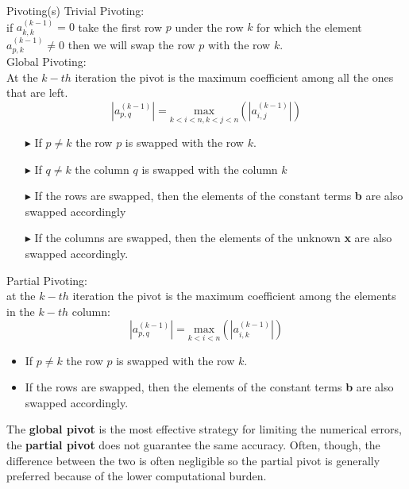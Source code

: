 \documentclass[xcolor={dvipsnames,rgb}, aspectratio=169]{beamer}
\begin{document}
\begin{frame}{Pivoting(s)}
   \vspace{-.5cm}
   \alert{Trivial Pivoting}:\\
   if $a_{k,k}^{(k-1)} = 0$ take the first row $p$ under the row $k$ for which the
   element $a_{p,k}^{(k-1)} \neq 0$ then we will swap the row $p$ with the row $k$.\\
   \alert{Global Pivoting}:\\
   At the $k-th$ iteration the pivot is the maximum coefficient among all the ones that
   are left.
   \begin{equation*}
      |a_{p,q}^{(k-1)}| = \underset{k<i<n,k<j<n}{\mathrm{max}}\left(|a_{i,j}^{(k-1)}|\right)
   \end{equation*}

   \footnotesize{
      \begin{itemize}
         \item[$\blacktriangleright$] If $p \neq k$ the row $p$ is swapped with the row
            $k$.
         \item[$\blacktriangleright$] If $q \neq k$ the column $q$ is swapped with the
            column $k$
         \item[$\blacktriangleright$] If the rows are swapped, then the elements of the
            constant terms \textbf{b} are also swapped accordingly
         \item[$\blacktriangleright$] If the columns are swapped, then the elements of
            the unknown \textbf{x} are also swapped accordingly.
      \end{itemize}
   }
\end{frame}

\begin{frame}{}
   \alert{Partial Pivoting}:\\
   at the $k-th$ iteration the pivot is the maximum coefficient among the elements in the
   $k-th$ column:
   \begin{equation*}
      |a_{p,q}^{(k-1)}| = \underset{k<i<n}{\mathrm{max}}\left(|a_{i,k}^{(k-1)}|\right)
   \end{equation*}

   \begin{itemize}
      \item If $p \neq k$ the row $p$ is swapped with the row $k$.
      \item If the rows are swapped, then the elements of the constant terms \textbf{b}
         are also swapped accordingly.
   \end{itemize}

   The \alert{\textbf{global pivot}} is the most effective strategy for limiting the
   numerical errors, the \alert{\textbf{partial pivot}} does not guarantee the same
   accuracy. Often, though, the difference between the two is often negligible so the
   partial pivot is generally preferred because of the lower computational burden.
\end{frame}
\end{document}
